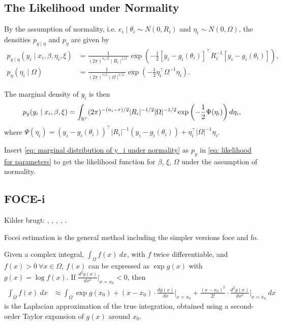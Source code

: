 \subsection{The Likelihood under Normality}
By the assumption of normality, i.e. $e_i\mid \theta_i \sim N(0,R_i)$ and $\eta_i \sim N(0,\Omega)$, the densities $p_{y\mid \eta}$ and $p_{\eta}$ are given by
\begin{align*}
    p_{y\mid \eta}(y_i\mid x_i,\beta,\eta_i,\xi) &= \frac{1}{(2\pi)^{n_i/2}\mid R_i\mid ^{1/2}}\exp{\left(-\frac{1}{2}\left[y_i-g_i(\theta_i)\right]^\top R_i^{-1}\left[y_i-g_i(\theta_i)\right]\right)},\\
    p_\eta(\eta_i\mid \Omega)&=\frac{1}{(2\pi)^{r/2}\mid \Omega\mid ^{1/2}}\exp{\left(-\frac{1}{2}\eta_i^\top \Omega^{-1}\eta_i\right)}.
\end{align*}

The marginal density of $y_i$ is then
\begin{align}
    p_y(y_i\mid x_i,\beta,\xi)=\int_{\mathbb{R}^r}(2\pi)^{-(n_i-r)/2}|R_i|^{-1/2}|\Omega|^{-1/2}\exp{\left(-\frac{1}{2}\Psi(\eta_i)\right)d\eta_i}, \label{eq: marginal distribution of y_i under normality}
\end{align}
where $\Psi(\eta_i)=\left(y_i-g_i(\theta_i)\right)^\top|R_i|^{-1}\left(y_i-g_i(\theta_i)\right)+\eta_i^\top|\Omega|^{-1}\eta_i$. 

Insert \eqref{eq: marginal distribution of y_i under normality} as $p_y$ in \eqref{eq: likelihood for parameters} to get the likelihood function for $\beta$, $\xi$, $\Omega$ under the assumption of normality.

\subsection{FOCE-i}
Kilder brugt: \cite{Almquist2015}, \cite{Bae2016}, \cite{Savic2009}, \cite{Wang2007}, \cite{Davidian1995}.

Focei estimation is the general method including the simpler versions foce and fo. 

Given a complex integral, $ \int_\Omega f(x) \ dx$, with $f$ twice differentiable, and $f(x)>0 \ \forall x \in \Omega$, $f(x)$ can be expressed as $\exp g(x)$ with $g(x)=\log f(x)$. If $\frac{d^2 g(x)}{d x^2}\big\rvert_{x=x_0}<0$, then
\begin{align*}
    \int_\Omega f(x) \ dx &\approx \int_\Omega \exp g(x_0) +(x-x_0) \cdot\frac{d g(x)}{d x}\Big\rvert_{x=x_0} +\frac{(x-x_0)^2}{2!} \cdot \frac{d^2 g(x)}{d x^2}\Big\rvert_{x=x_0}\ dx
\end{align*}
is the Laplacian approximation of the true integration, obtained using a second-order Taylor expansion of $g(x)$ around $x_0$. 

